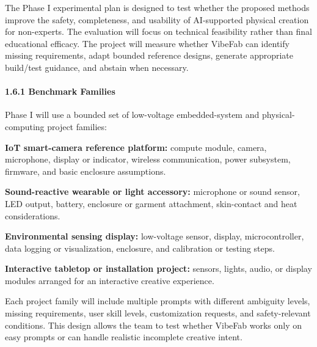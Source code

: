 
The Phase I experimental plan is designed to test whether the proposed methods improve the safety, completeness, and usability of AI-supported physical creation for non-experts. The evaluation will focus on technical feasibility rather than final educational efficacy. The project will measure whether VibeFab can identify missing requirements, adapt bounded reference designs, generate appropriate build/test guidance, and abstain when necessary.

\vspace{-10pt}
\paragraph{1.6.1 Benchmark Families}

Phase I will use a bounded set of low-voltage embedded-system and physical-computing project families:

\textbf{IoT smart-camera reference platform:} compute module, camera, microphone, display or indicator, wireless communication, power subsystem, firmware, and basic enclosure assumptions.

\textbf{Sound-reactive wearable or light accessory:} microphone or sound sensor, LED output, battery, enclosure or garment attachment, skin-contact and heat considerations.

\textbf{Environmental sensing display:} low-voltage sensor, display, microcontroller, data logging or visualization, enclosure, and calibration or testing steps.

\textbf{Interactive tabletop or installation project:} sensors, lights, audio, or display modules arranged for an interactive creative experience.


Each project family will include multiple prompts with different ambiguity levels, missing requirements, user skill levels, customization requests, and safety-relevant conditions. This design allows the team to test whether VibeFab works only on easy prompts or can handle realistic incomplete creative intent.

